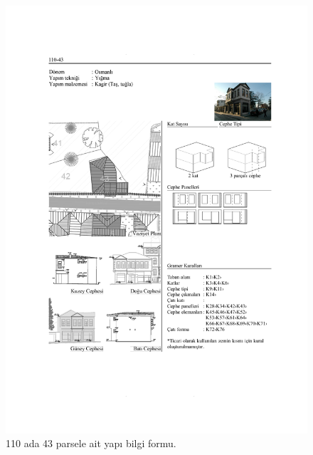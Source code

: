 \begin{figure}
\centering
\includegraphics[width=1\textwidth,height=\textheight]{source/figures/BilgiFormlari/110-43.pdf}
\caption{110 ada 43 parsele ait yapı bilgi formu.}
\end{figure}

